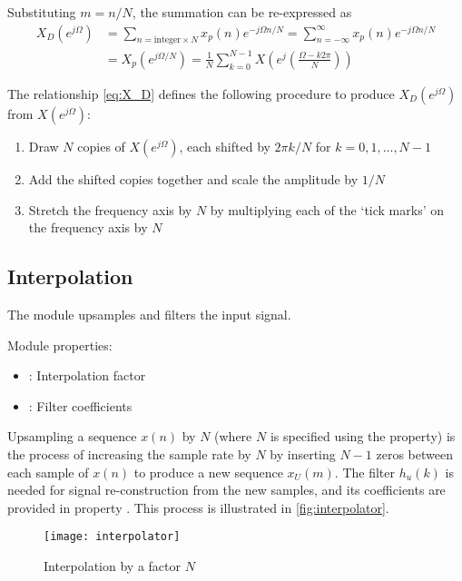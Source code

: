Substituting $m=n/N$, the summation can be re-expressed as
\begin{align}
  X_D(e^{j\Omega}) &= \sum_{n=\text{integer}\times N} x_p(n)e^{-j\Omega n/N} = \sum_{n=-\infty}^{\infty} x_p(n)e^{-j\Omega n/N} \nonumber\\
                   &= X_p(e^{j\Omega / N}) = \frac{1}{N} \sum_{k=0}^{N-1}X\left(e^j\left(\frac{\Omega-k2\pi}{N}\right)\right) \label{eq:X_D}
\end{align}

The relationship \eqref{eq:X_D} defines the following procedure to produce $X_D(e^{j\Omega})$ from $X(e^{j\Omega})$:
\begin{enumerate}
  \item Draw $N$ copies of $X(e^{j\Omega})$, each shifted by $2\pi k/N$ for $k=0,1,\ldots,N-1$
  \item Add the shifted copies together and scale the amplitude by $1/N$
  \item Stretch the frequency axis by $N$ by multiplying each of the `tick marks' on the frequency axis by $N$
\end{enumerate}

\subsection{Interpolation}

The  module upsamples and filters the input signal.

\noindent Module properties:
\begin{itemize}
  \item {}: Interpolation factor
  \item {}: Filter coefficients
\end{itemize}

Upsampling a sequence $x(n)$ by $N$ (where $N$ is specified using the  property) is the process of increasing the sample rate by $N$ by inserting $N-1$ zeros between each sample of $x(n)$ to produce a new sequence $x_U(m)$. The filter $h_u(k)$ is needed for signal re-construction from the new samples, and its coefficients are provided in property . This process is illustrated in \autoref{fig:interpolator}.

\begin{figure}[ht]
  \centering
  \texttt{[image: interpolator]}
  \caption{Interpolation by a factor $N$}
  \label{fig:interpolator}
\end{figure}

